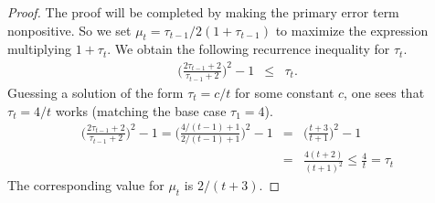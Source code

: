 \documentclass{acmsmall}
\newcommand{\cB}{{\cal B}}
\newcommand{\cT}{{\cal T}}
\newcommand{\width}{{\bf {\rm  w}}}
\newcommand{\errorterm}{\zeta}
\begin{document}
\begin{proof}
The proof will be completed by making the primary error term nonpositive. So we set
$\mu_t=\tau_{t-1}/2(1+\tau_{t-1})$ to maximize the expression multiplying $1+\tau_t$.
We obtain the following recurrence inequality for $\tau_t$.
%
\begin{eqnarray*}
\Big(\frac{2\tau_{t-1}+2}{\tau_{t-1}+2}\Big)^2 -1  & \leq  & \tau_t.
\end{eqnarray*}
%
Guessing a solution of the form $\tau_t=c/t$ for some constant $c$, one sees that $\tau_t=4/t$ works (matching the
base case $\tau_1=4$).
%
\begin{eqnarray*}
\Big(\frac{2\tau_{t-1}+2}{\tau_{t-1}+2}\Big)^2 -1 = \Big(\frac{4/(t-1)+1}{2/(t-1)+1}\Big)^2 -1 & = & \Big(\frac{t+3}{t+1}\Big)^2 - 1 \\
& = & \frac{4(t+2)}{(t+1)^2} \leq \frac{4}{t} = \tau_t
\end{eqnarray*}
%
The corresponding value for $\mu_t$ is $2/(t+3)$.
\end{proof}

%
%
%
%
%
%
%
%
\fi
\end{document}
